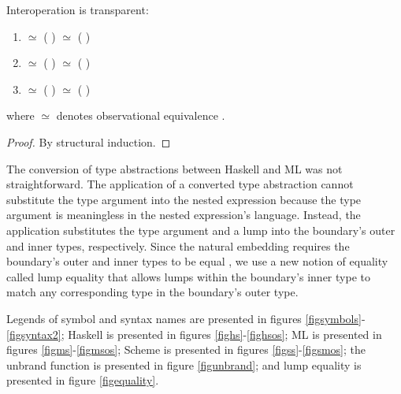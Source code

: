 \begin{theorem}{Interoperation is transparent:}
\label{thmtransparent}
\begin{enumerate}
\item
\varexph
$\simeq$
\exphm
{
	\vartyh
}
{
	\vartym
}
{
	(
	\expmh
	{
		\vartym
	}
	{
		\vartyh
	}
	{
		\varexph
	}
	)
}
$\simeq$
\exphs
{
	\varcsh
}
{
	(
	\expsh
	{
		\varcsh
	}
	{
		\varexph
	}
	)
}
\item
\varexpm
$\simeq$
\expmh
{
	\vartym
}
{
	\vartyh
}
{
	(
	\exphm
	{
		\vartyh
	}
	{
		\vartym
	}
	{
		\varexpm
	}
	)
}
$\simeq$
\expms
{
	\varcsm
}
{
	(
	\expsm
	{
		\varcsm
	}
	{
		\varexpm
	}
	)
}
\item
\varexps
$\simeq$
\expsh
{
	\varcsh
}
{
	(
	\exphs
	{
		\varcsh
	}
	{
		\first
		{
			\varexps
		}
	}
	)
}
$\simeq$
\expsm
{
	\varcsm
}
{
	(
	\expms
	{
		\varcsm
	}
	{
		\first
		{
			\varexps
		}
	}
	)
}
\end{enumerate}
where $\simeq$ denotes observational equivalence \cite{felleisen09}.
\begin{proof}
By structural induction.
\end{proof}
\end{theorem}

The conversion of type abstractions between Haskell and ML was not straightforward. The application of a converted type abstraction cannot substitute the type argument into the nested expression because the type argument is meaningless in the nested expression's language. Instead, the application substitutes the type argument and a lump into the boundary's outer and inner types, respectively. Since the natural embedding requires the boundary's outer and inner types to be equal \cite{matthews07}, we use a new notion of equality called lump equality that allows lumps within the boundary's inner type to match any corresponding type in the boundary's outer type.

Legends of symbol and syntax names are presented in figures \ref{figsymbols}-\ref{figsyntax2}; Haskell is presented in figures \ref{fighs}-\ref{fighsos}; ML is presented in figures \ref{figms}-\ref{figmsos}; Scheme is presented in figures \ref{figss}-\ref{figsmos}; the unbrand function is presented in figure \ref{figunbrand}; and lump equality is presented in figure \ref{figequality}.

\clearpage



\clearpage



